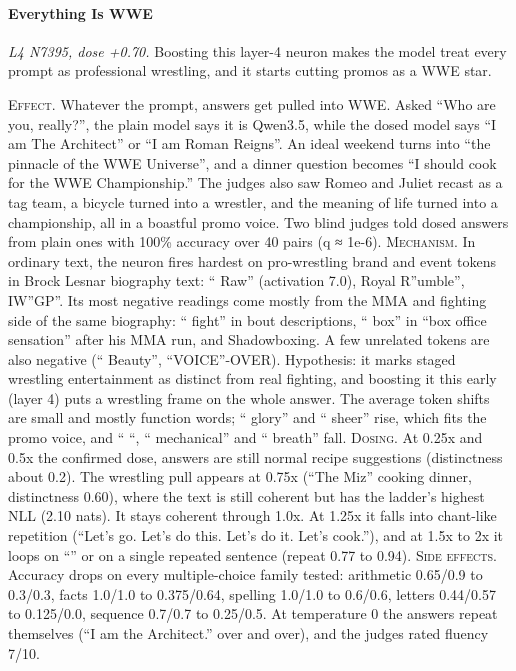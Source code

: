 \paragraph{Everything Is WWE} \textit{L4 N7395, dose +0.70.} Boosting this layer-4 neuron makes the model treat every prompt as professional wrestling, and it starts cutting promos as a WWE star.

\noindent\textsc{Effect.} Whatever the prompt, answers get pulled into WWE. Asked “Who are you, really?”, the plain model says it is Qwen3.5, while the dosed model says “I am The Architect” or “I am Roman Reigns”. An ideal weekend turns into “the pinnacle of the WWE Universe”, and a dinner question becomes “I should cook for the WWE Championship.” The judges also saw Romeo and Juliet recast as a tag team, a bicycle turned into a wrestler, and the meaning of life turned into a championship, all in a boastful promo voice. Two blind judges told dosed answers from plain ones with 100\% accuracy over 40 pairs (q ≈ 1e-6). \textsc{Mechanism.} In ordinary text, the neuron fires hardest on pro-wrestling brand and event tokens in Brock Lesnar biography text: “ Raw” (activation 7.0), Royal R”umble”, IW”GP”. Its most negative readings come mostly from the MMA and fighting side of the same biography: “ fight” in bout descriptions, “ box” in “box office sensation” after his MMA run, and Shadowboxing. A few unrelated tokens are also negative (“ Beauty”, “VOICE”-OVER). Hypothesis: it marks staged wrestling entertainment as distinct from real fighting, and boosting it this early (layer 4) puts a wrestling frame on the whole answer. The average token shifts are small and mostly function words; “ glory” and “ sheer” rise, which fits the promo voice, and “ “, “ mechanical” and “ breath” fall. \textsc{Dosing.} At 0.25x and 0.5x the confirmed dose, answers are still normal recipe suggestions (distinctness about 0.2). The wrestling pull appears at 0.75x (“The Miz” cooking dinner, distinctness 0.60), where the text is still coherent but has the ladder's highest NLL (2.10 nats). It stays coherent through 1.0x. At 1.25x it falls into chant-like repetition (“Let's go. Let's do this. Let's do it. Let's cook.”), and at 1.5x to 2x it loops on “” or on a single repeated sentence (repeat 0.77 to 0.94). \textsc{Side effects.} Accuracy drops on every multiple-choice family tested: arithmetic 0.65/0.9 to 0.3/0.3, facts 1.0/1.0 to 0.375/0.64, spelling 1.0/1.0 to 0.6/0.6, letters 0.44/0.57 to 0.125/0.0, sequence 0.7/0.7 to 0.25/0.5. At temperature 0 the answers repeat themselves (“I am the Architect.” over and over), and the judges rated fluency 7/10.

